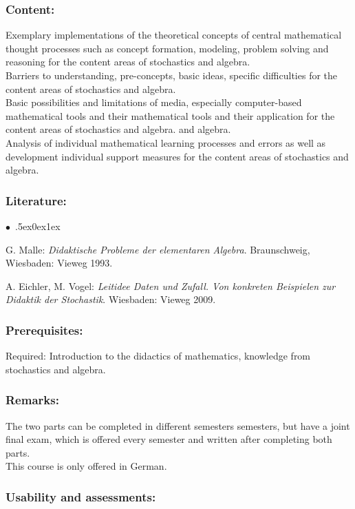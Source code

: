 \documentclass[a4paper,10pt]{article}
\renewenvironment{itemize}{\begin{list}{$\bullet$\ }{\itemsep.5ex\setlength{\topsep}{0.5\itemsep}\parsep0ex\labelsep1ex\settowidth{\labelwidth}{$\bullet$\ }\setlength{\leftmargin}{\labelwidth}\addtolength{\leftmargin}{3ex}\addtolength{\leftmargin}{\labelsep}}}{\end{list}}
\begin{document}
\subsubsection*{\large
    Content:
}
Exemplary implementations of the theoretical concepts of central mathematical thought processes such as concept formation, modeling, problem solving and reasoning for the content areas of stochastics and algebra. \\
Barriers to understanding, pre-concepts, basic ideas, specific difficulties for the content areas of stochastics and algebra.\\
Basic possibilities and limitations of media, especially computer-based mathematical tools and their mathematical tools and their application for the content areas of stochastics and algebra. and algebra. \\
Analysis of individual mathematical learning processes and errors as well as development individual support measures for the content areas of stochastics and algebra.
\subsubsection*{\large
    Literature:
}
\begin{itemize}
\item 
G. Malle: \emph{Didaktische Probleme der elementaren Algebra}. Braunschweig, Wiesbaden: Vieweg 1993. 
\item
A. Eichler, M. Vogel: \emph{Leitidee Daten und Zufall. Von konkreten Beispielen zur Didaktik der Stochastik}. Wiesbaden:
Vieweg 2009.
\end{itemize}
\subsubsection*{\large
    Prerequisites:
}
Required: Introduction to the didactics of mathematics, knowledge from stochastics and algebra.
\subsubsection*{\large
    Remarks:
}
The two parts can be completed in different semesters semesters, but have a joint final exam, which is offered every semester and written after completing both parts. \\ This course is only offered in German.
\subsubsection*{\large
    Usability and assessments:
}
\end{document}
